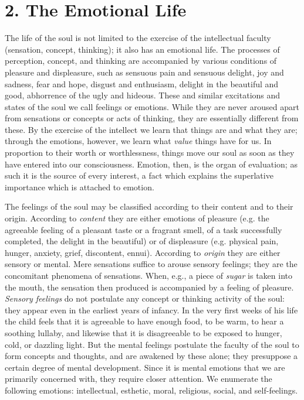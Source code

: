 \section{2. The Emotional Life}

The life of the soul is not limited to the exercise of the intellectual faculty (sensation, concept, thinking); it also has an emotional life. The processes of perception,
concept, and thinking are accompanied by various conditions of pleasure and displeasure, such as sensuous pain and sensuous delight, joy and sadness, fear and hope, disgust and enthusiasm, delight in the beautiful and good, abhorrence of the ugly and hideous. These and similar excitations and states of the soul we call feelings or emotions. While they are never aroused apart from sensations or concepts or acts of thinking, they are essentially different from these. By the exercise of the intellect we learn that things are and what they are; through the emotions, however, we learn what \emph{value} things have for us. In proportion to their worth or worthlessness, things move our soul as soon as they have entered into our consciousness. Emotion, then, is the organ of evaluation; as such it is the source of every interest, a fact which explains the superlative importance which is attached to emotion.

The feelings of the soul may be classified according to their content and to their origin. According to \emph{content} they are either emotions of pleasure (e.g. the agreeable feeling of a pleasant taste or a fragrant smell, of a task successfully completed, the delight in the beautiful) or of displeasure (e.g. physical pain, hunger, anxiety, grief, discontent, ennui). According to \emph{origin} they are either sensory or mental. Mere sensations suffice to arouse sensory feelings; they are the concomitant phenomena of sensations. When, e.g., a piece of \emph{sugar} is taken into the mouth, the sensation then produced is accompanied by a feeling of pleasure. \emph{Sensory feelings} do not postulate any concept or thinking activity of the soul: they appear even in the earliest years of infancy. In the very first weeks of his life the child feels that it is agreeable to have enough food, to be warm, to hear a soothing lullaby, and likewise that it is disagreeable to be exposed to hunger, cold, or dazzling light. But the mental feelings postulate the faculty of the soul to form concepts
and thoughts, and are awakened by these alone; they presuppose a certain degree of mental development. Since it is mental emotions that we are primarily concerned with, they require closer attention. We enumerate the following emotions: intellectual, esthetic, moral, religious, social, and self-feelings.

